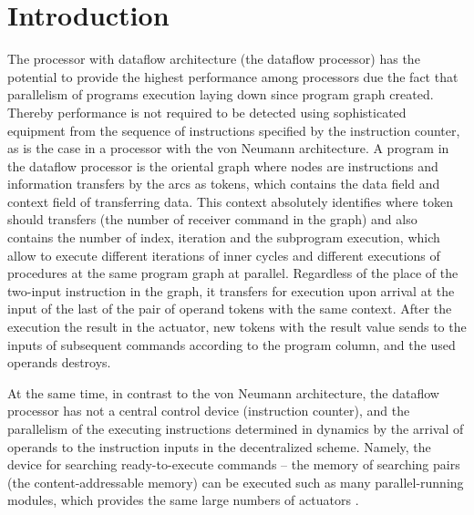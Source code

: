 \documentclass[
11pt,%
tightenlines,%
twoside,%
onecolumn,%
nofloats,%
nobibnotes,%
nofootinbib,%
superscriptaddress,%
noshowpacs,%
centertags]%
{revtex4}
\begin{document}


\maketitle

\section{Introduction}

The processor with dataflow architecture (the dataflow processor) has the potential to provide the highest performance among processors due the fact that parallelism of programs execution laying down since program graph created.
Thereby performance is not required to be detected using sophisticated equipment from the sequence of instructions specified by the instruction counter, as is the case in a processor with the von Neumann architecture.
A program in the dataflow processor is the oriental graph where nodes are instructions and information transfers by the arcs as tokens, which contains the data field and context field of transferring data.
This context absolutely identifies where token should transfers (the number of receiver command in the graph) and also contains the number of index, iteration and the subprogram execution, which allow to execute different iterations of inner cycles and different executions of procedures at the same program graph at parallel.
Regardless of the place of the two-input instruction in the graph, it transfers for execution upon arrival at the input of the last of the pair of operand tokens with the same context.
After the execution the result in the actuator, new tokens with the result value sends to the inputs of subsequent commands according to the program column, and the used operands destroys.

At the same time, in contrast to the von Neumann architecture, the dataflow processor has not a central control device (instruction counter), and the parallelism of the executing instructions determined in dynamics by the arrival of operands to the instruction inputs in the decentralized scheme.
Namely, the device for searching ready-to-execute commands -- the memory of searching pairs (the content-addressable memory) can be executed such as many parallel-running modules, which provides the same large numbers of actuators \cite{fine-grained-prl}.
\end{document}
